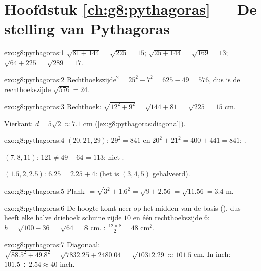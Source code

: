 \section*{Hoofdstuk \ref{ch:g8:pythagoras} --- De stelling van Pythagoras}

\begin{solution}{exo:g8:pythagoras:1}
$\sqrt{81 + 144} = \sqrt{225} = 15$; \quad
$\sqrt{25 + 144} = \sqrt{169} = 13$; \quad
$\sqrt{64 + 225} = \sqrt{289} = 17$.
\end{solution}

\begin{solution}{exo:g8:pythagoras:2}
Rechthoekszijde$^2 = 25^2 - 7^2 = 625 - 49 = 576$, dus is de rechthoekszijde
$\sqrt{576} = 24$.
\end{solution}

\begin{solution}{exo:g8:pythagoras:3}
Rechthoek: $\sqrt{12^2 + 9^2} = \sqrt{144 + 81} = \sqrt{225} = 15$ cm.

Vierkant: $d = 5\sqrt2 \approx 7.1$ cm
(\cref{ex:g8:pythagoras:diagonal}).
\end{solution}

\begin{solution}{exo:g8:pythagoras:4}
$(20, 21, 29)$: $29^2 = 841$ en $20^2 + 21^2 = 400 + 441 = 841$: .

$(7, 8, 11)$: $121 \neq 49 + 64 = 113$: niet .

$(1.5, 2, 2.5)$: $6.25 = 2.25 + 4$:  (het is $(3,4,5)$ gehalveerd).
\end{solution}

\begin{solution}{exo:g8:pythagoras:5}
Plank $= \sqrt{3^2 + 1.6^2} = \sqrt{9 + 2.56} = \sqrt{11.56} = 3.4$ m.
\end{solution}

\begin{solution}{exo:g8:pythagoras:6}
De hoogte komt neer op het midden van de basis (), dus heeft
elke halve driehoek schuine zijde $10$ en één rechthoekszijde $6$:
$h = \sqrt{100 - 36} = \sqrt{64} = 8$ cm. :
$\frac{12 \times 8}{2} = 48$ cm$^2$.
\end{solution}

\begin{solution}{exo:g8:pythagoras:7}
Diagonaal: $\sqrt{88.5^2 + 49.8^2} = \sqrt{7832.25 + 2480.04}
= \sqrt{10312.29} \approx 101.5$ cm. In inch:
$101.5 \div 2.54 \approx 40$ inch.
\end{solution}

